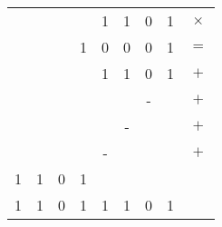 \documentclass{standalone}
\begin{document}
\begin{tabular}{ cccccccc||c }
	& & & & 1 & 1 & 0 & 1 &  \(\times\)\\
	& & & 1 & 0 & 0 & 0 & 1 & \(=\)\\\hline
	& & & & 1 & 1 & 0 & 1 & \(+\)\\
	& & & & & & - & & \(+\)\\
	& & & & & - & & & \(+\)\\
	& & & & - & & & & \(+\)\\
	1 & 1 & 0 & 1 & & & & & \\\hline
	1 & 1 & 0 & 1 & 1 & 1 & 0 & 1 &
\end{tabular}
\end{document}

